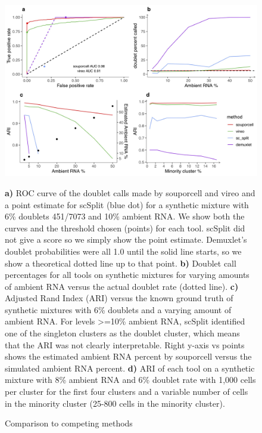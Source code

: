 \begin{figure}[htbp!]
\caption{Comparison to competing methods}
\label{figure:compare}
\begin{centering}

\includegraphics[width=\textwidth]{humcompare.jpg} 
\par{\textbf{a)} ROC curve of the doublet calls made by souporcell and vireo and a point estimate for scSplit (blue dot) for a synthetic mixture with 6\% doublets 451/7073 and 10\% ambient RNA. We show both the curves and the threshold chosen (points) for each tool. scSplit did not give a score so we simply show the point estimate. Demuxlet's doublet probabilities were all 1.0 until the solid line starts, so we show a theoretical dotted line up to that point. \textbf{b)} Doublet call percentages for all tools on synthetic mixtures for varying amounts of ambient RNA versus the actual doublet rate (dotted line). \textbf{c)} Adjusted Rand Index (ARI) versus the known ground truth of synthetic mixtures with 6\% doublets and a varying amount of ambient RNA. For levels >=10\% ambient RNA, scSplit identified one of the singleton clusters as the doublet cluster, which means that the ARI was not clearly interpretable. Right y-axis vs points shows the estimated ambient RNA percent by souporcell versus the simulated ambient RNA percent. \textbf{d)} ARI of each tool on a synthetic mixture with 8\% ambient RNA and 6\% doublet rate with 1,000 cells per cluster for the first four clusters and a variable number of cells in the minority cluster (25-800 cells in the minority cluster).}

\end{centering}
\end{figure}

